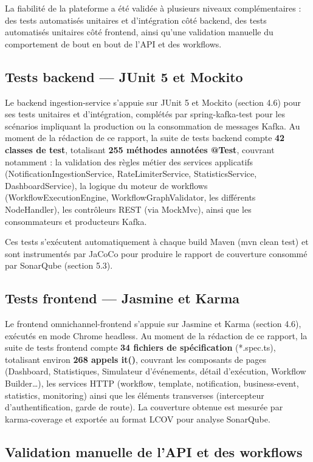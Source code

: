 \documentclass[12pt,a4paper]{report}
\begin{document}
La fiabilité de la plateforme a été validée à plusieurs niveaux complémentaires : des tests automatisés unitaires et d'intégration côté backend, des tests automatisés unitaires côté frontend, ainsi qu'une validation manuelle du comportement de bout en bout de l'API et des workflows.

\subsection{Tests backend --- JUnit 5 et Mockito}

Le backend ingestion-service s'appuie sur JUnit 5 et Mockito (section 4.6) pour ses tests unitaires et d'intégration, complétés par spring-kafka-test pour les scénarios impliquant la production ou la consommation de messages Kafka. Au moment de la rédaction de ce rapport, la suite de tests backend compte \textbf{42 classes de test}, totalisant \textbf{255 méthodes annotées @Test}, couvrant notamment : la validation des règles métier des services applicatifs (NotificationIngestionService, RateLimiterService, StatisticsService, DashboardService), la logique du moteur de workflows (WorkflowExecutionEngine, WorkflowGraphValidator, les différents NodeHandler), les contrôleurs REST (via MockMvc), ainsi que les consommateurs et producteurs Kafka.

Ces tests s'exécutent automatiquement à chaque build Maven (mvn clean test) et sont instrumentés par JaCoCo pour produire le rapport de couverture consommé par SonarQube (section 5.3).

\subsection{Tests frontend --- Jasmine et Karma}

Le frontend omnichannel-frontend s'appuie sur Jasmine et Karma (section 4.6), exécutés en mode Chrome headless. Au moment de la rédaction de ce rapport, la suite de tests frontend compte \textbf{34 fichiers de spécification} (*.spec.ts), totalisant environ \textbf{268 appels it()}, couvrant les composants de pages (Dashboard, Statistiques, Simulateur d'événements, détail d'exécution, Workflow Builder…), les services HTTP (workflow, template, notification, business-event, statistics, monitoring) ainsi que les éléments transverses (intercepteur d'authentification, garde de route). La couverture obtenue est mesurée par karma-coverage et exportée au format LCOV pour analyse SonarQube.

\subsection{Validation manuelle de l'API et des workflows}
\end{document}

